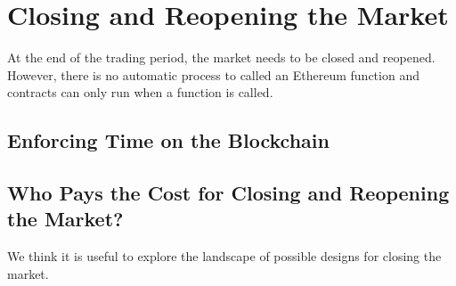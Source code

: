 

\section{Closing and Reopening the Market}


At the end of the trading period, the market needs to be closed and reopened. However, there is no automatic process to called an Ethereum function and contracts can only run when a function is called. 




\subsection{Enforcing Time on the Blockchain}






\subsection{Who Pays the Cost for Closing and Reopening the Market?}



We think it is useful to explore the landscape of possible designs for closing the market. 

